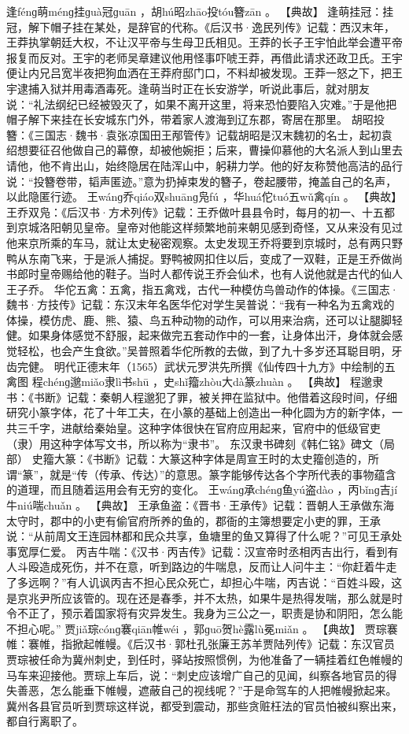 \documentclass[12pt,UTF8]{ctexbook}
\begin{document}
逢fénɡ萌ménɡ挂ɡuà冠ɡuān
，胡hú昭zhāo投tóu簪zān
。
【典故】
逢萌挂冠：挂冠，解下帽子挂在某处，是辞官的代称。《后汉书·逸民列传》记载：西汉末年，王莽执掌朝廷大权，不让汉平帝与生母卫氏相见。王莽的长子王宇怕此举会遭平帝报复而反对。王宇的老师吴章建议他用怪事吓唬王莽，再借此请求还政卫氏。王宇便让内兄吕宽半夜把狗血洒在王莽府邸门口，不料却被发现。王莽一怒之下，把王宇逮捕入狱并用毒酒毒死。逢萌当时正在长安游学，听说此事后，就对朋友说：“礼法纲纪已经被毁灭了，如果不离开这里，将来恐怕要陷入灾难。”于是他把帽子解下来挂在长安城东门外，带着家人渡海到辽东郡，寄居在那里。
胡昭投簪：《三国志·魏书·袁张凉国田王邴管传》记载胡昭是汉末魏初的名士，起初袁绍想要征召他做自己的幕僚，却被他婉拒；后来，曹操仰慕他的大名派人到山里去请他，他不肯出山，始终隐居在陆浑山中，躬耕力学。他的好友称赞他高洁的品行说：“投簪卷带，韬声匿迹。”意为扔掉束发的簪子，卷起腰带，掩盖自己的名声，以此隐匿行迹。
王wánɡ乔qiáo双shuānɡ凫fú
，华huá佗tuó五wǔ禽qín
。
【典故】
王乔双凫：《后汉书·方术列传》记载：王乔做叶县县令时，每月的初一、十五都到京城洛阳朝见皇帝。皇帝对他能这样频繁地前来朝见感到奇怪，又从来没有见过他来京所乘的车马，就让太史秘密观察。太史发现王乔将要到京城时，总有两只野鸭从东南飞来，于是派人捕捉。野鸭被网扣住以后，变成了一双鞋，正是王乔做尚书郎时皇帝赐给他的鞋子。当时人都传说王乔会仙术，也有人说他就是古代的仙人王子乔。
华佗五禽：五禽，指五禽戏，古代一种模仿鸟兽动作的体操。《三国志·魏书·方技传》记载：东汉末年名医华佗对学生吴普说：“我有一种名为五禽戏的体操，模仿虎、鹿、熊、猿、鸟五种动物的动作，可以用来治病，还可以让腿脚轻健。如果身体感觉不舒服，起来做完五套动作中的一套，让身体出汗，身体就会感觉轻松，也会产生食欲。”吴普照着华佗所教的去做，到了九十多岁还耳聪目明，牙齿完健。
明代正德末年（1565）武状元罗洪先所撰《仙传四十九方》中绘制的五禽图
程chénɡ邈miǎo隶lì书shū
，史shǐ籀zhòu大dà篆zhuàn
。
【典故】
程邈隶书：《书断》记载：秦朝人程邈犯了罪，被关押在监狱中。他借着这段时间，仔细研究小篆字体，花了十年工夫，在小篆的基础上创造出一种化圆为方的新字体，一共三千字，进献给秦始皇。这种字体很快在官府应用起来，官府中的低级官吏（隶）用这种字体写文书，所以称为“隶书”。
东汉隶书碑刻《韩仁铭》碑文（局部）
史籀大篆：《书断》记载：大篆这种字体是周宣王时的太史籀创造的，所谓“篆”，就是“传（传承、传达）”的意思。篆字能够传达各个字所代表的事物蕴含的道理，而且随着运用会有无穷的变化。
王wánɡ承chénɡ鱼yú盗dào
，丙bǐnɡ吉jí牛niú喘chuǎn
。
【典故】
王承鱼盗：《晋书·王承传》记载：晋朝人王承做东海太守时，郡中的小吏有偷官府所养的鱼的，郡衙的主簿想要定小吏的罪，王承说：“从前周文王连园林都和民众共享，鱼塘里的鱼又算得了什么呢？”可见王承处事宽厚仁爱。
丙吉牛喘：《汉书·丙吉传》记载：汉宣帝时丞相丙吉出行，看到有人斗殴造成死伤，并不在意，听到路边的牛喘息，反而让人问牛主：“你赶着牛走了多远啊？”有人讥讽丙吉不担心民众死亡，却担心牛喘，丙吉说：“百姓斗殴，这是京兆尹所应该管的。现在还是春季，并不太热，如果牛是热得发喘，那么就是时令不正了，预示着国家将有灾异发生。我身为三公之一，职责是协和阴阳，怎么能不担心呢。”
贾jiǎ琮cónɡ褰qiān帷wéi
，郭ɡuō贺hè露lù冕miǎn
。
【典故】
贾琮褰帷：褰帷，指掀起帷幔。《后汉书·郭杜孔张廉王苏羊贾陆列传》记载：东汉官员贾琮被任命为冀州刺史，到任时，驿站按照惯例，为他准备了一辆挂着红色帷幔的马车来迎接他。贾琮上车后，说：“刺史应该增广自己的见闻，纠察各地官员的得失善恶，怎么能垂下帷幔，遮蔽自己的视线呢？”于是命驾车的人把帷幔掀起来。冀州各县官员听到贾琮这样说，都受到震动，那些贪赃枉法的官员怕被纠察出来，都自行离职了。
\end{document}
